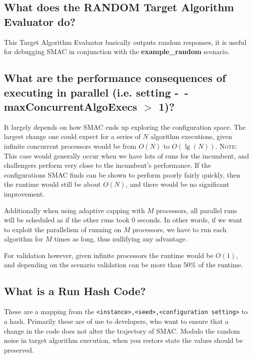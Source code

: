 \documentclass[11pt,letterpaper,oneside]{article}
\begin{document}
\subsection{What does the RANDOM Target Algorithm Evaluator do?}

This Target Algorithm Evaluator basically outputs random responses, it is useful for debugging SMAC in conjunction with the \textbf{example\_random} scenario.

\subsection{What are the performance consequences of executing in parallel (i.e. setting \textbf{-~$\!$-maxConcurrentAlgoExecs} $>$ 1)?}
	
	It largely depends on how SMAC ends up exploring the configuration space. The largest change one could expect for a series of $N$ algorithm executions, given infinite concurrent processors would be from $O(N)$ to $O(\lg(N))$. \textsc{Note:} This case would generally occur when we have lots of runs for the incumbent, and challengers perform very close to the incumbent's performance. If the configurations SMAC finds can be shown to perform poorly fairly quickly, then the runtime would still be about $O(N)$, and there would be no significant improvement.
	
	Additionally when using adaptive capping with $M$ processors, all parallel runs will be scheduled as if the other runs took 0 seconds. In other words, if we want to exploit the parallelism of running on $M$ processors, we have to run each algorithm for $M$ times as long, thus nullifying any advantage.
	
	For validation however, given infinite processors the runtime would be $O(1)$, and depending on the scenario validation can be more than 50\% of the runtime.


\subsection{What is a Run Hash Code?}

These are a mapping from the \texttt{<instance>,<seed>,<configuration setting>} to a hash. Primarily these are of use to developers, who want to ensure that a change in the code does not alter the trajectory of SMAC. Modulo the random noise in target algorithm execution, when you restore state the values should be preserved.
\end{document}
